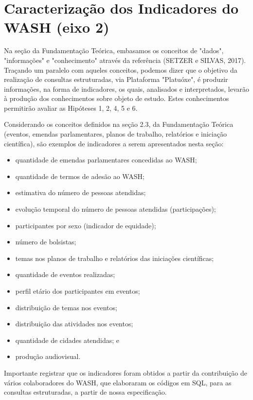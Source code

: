 \section[Caracterização dos Indicadores do WASH (eixo 2)]{Caracterização dos Indicadores do WASH (eixo 2)}\label{Caracterização dos Indicadores do WASH (eixo 2)}
Na seção da Fundamentação Teórica, embasamos os conceitos de "dados", "informações" e "conhecimento"  através da referência (SETZER  e SILVAS, 2017). Traçando um paralelo com aqueles conceitos, podemos dizer que o objetivo da realização de consultas estruturadas, via Plataforma "Platuóxe", é produzir informações, na forma de indicadores, os quais, analisados e interpretados, levarão à produção dos conhecimentos sobre objeto de estudo. Estes conhecimentos permitirão avaliar as Hipóteses 1, 2, 4, 5 e 6.

Considerando os conceitos definidos na seção 2.3, da Fundamentação Teórica (eventos, emendas parlamentares, planos de trabalho, relatórios e iniciação científica), são exemplos de indicadores a serem apresentados nesta seção:


\begin{itemize}
\item quantidade de emendas parlamentares concedidas ao WASH;
\item quantidade de termos de adesão ao WASH;
\item estimativa do número de pessoas atendidas;
\item evolução temporal do número de pessoas atendidas (participações);
\item participantes por sexo (indicador de equidade);
\item número de bolsistas;
\item temas nos planos de trabalho e relatórios das iniciações científicas;
\item quantidade de eventos realizadas;
\item perfil etário dos participantes em eventos;
\item distribuição de temas nos eventos;
\item distribuição das atividades nos eventos;
\item quantidade de cidades atendidas; e
\item produção audiovisual.
\end{itemize}

Importante registrar que os indicadores foram obtidos a partir da contribuição de vários colaboradores do WASH, que elaboraram os códigos em SQL, para as consultas estruturadas, a partir de nossa especificação.


